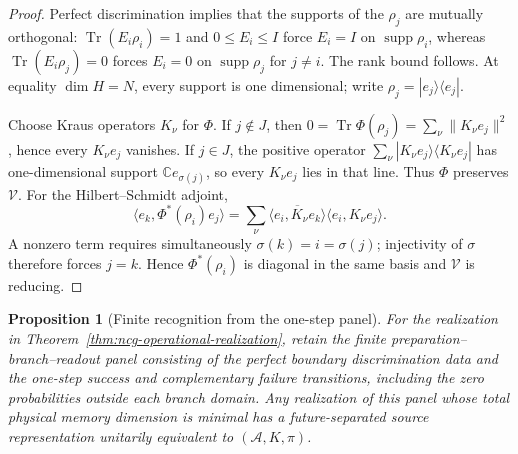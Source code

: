 \documentclass[11pt]{article}
\newtheorem{proposition}[proposition]{Proposition}
\theoremstyle{definition}
\theoremstyle{remark}
\theoremstyle{definition}
\theoremstyle{remark}
\newcommand{\Tr}{\operatorname{Tr}}
\newcommand{\supp}{\operatorname{supp}}
\newcommand{\A}{\mathcal A}
\begin{document}
\begin{proof}
Perfect discrimination implies that the supports of the $\rho_j$ are mutually
orthogonal: $\Tr(E_i\rho_i)=1$ and $0\le E_i\le I$ force $E_i=I$ on
$\supp\rho_i$, whereas $\Tr(E_i\rho_j)=0$ forces $E_i=0$ on
$\supp\rho_j$ for $j\ne i$.  The rank bound follows.  At equality
$\dim H=N$, every support is one dimensional; write
$\rho_j=|e_j\rangle\langle e_j|$.

Choose Kraus operators $K_\nu$ for $\Phi$.  If $j\notin J$, then
$0=\Tr\Phi(\rho_j)=\sum_\nu\|K_\nu e_j\|^2$, hence every
$K_\nu e_j$ vanishes.  If $j\in J$, the positive operator
$\sum_\nu|K_\nu e_j\rangle\langle K_\nu e_j|$ has one-dimensional support
$\mathbb C e_{\sigma(j)}$, so every $K_\nu e_j$ lies in that line.  Thus
$\Phi$ preserves $\mathcal V$.  For the Hilbert--Schmidt adjoint,
\[
 \langle e_k,\Phi^*(\rho_i)e_j\rangle
 =\sum_\nu
   \overline{\langle e_i,K_\nu e_k\rangle}
   \langle e_i,K_\nu e_j\rangle.
\]
A nonzero term requires simultaneously $\sigma(k)=i=\sigma(j)$; injectivity of
$\sigma$ therefore forces $j=k$.  Hence $\Phi^*(\rho_i)$ is diagonal in the same
basis and $\mathcal V$ is reducing.
\end{proof}

\begin{proposition}[Finite recognition from the one-step panel]
\label{prop:ncg-operational-recognition}
For the realization in Theorem~\ref{thm:ncg-operational-realization}, retain the
finite preparation--branch--readout panel consisting of the perfect boundary
discrimination data and the one-step success and complementary failure
transitions, including the zero probabilities outside each branch domain.  Any realization of this
panel whose total physical memory dimension is minimal has a future-separated
source representation unitarily equivalent to $(\A,K,\pi)$.
\end{proposition}
\end{document}

